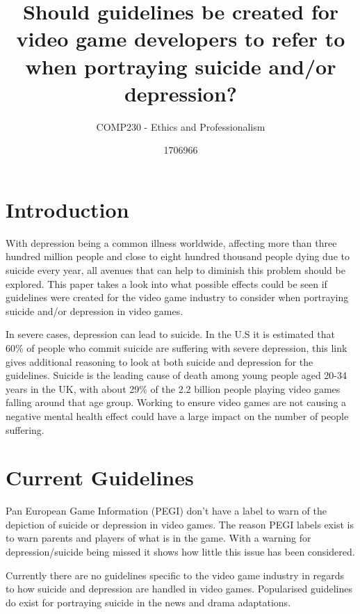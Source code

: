 \documentclass{scrartcl}
\title{Should guidelines be created for video game developers to
	refer to when portraying suicide and/or depression?}
\subtitle{COMP230 - Ethics and Professionalism}
\author{1706966}
\begin{document}
	
	\maketitle
	
	
	\abstract{}
	
	\section{Introduction}
		With depression being a common illness worldwide, affecting more than three hundred million people and close to eight hundred thousand people dying due to suicide every year\cite{DepressionStats}, all avenues that can help to diminish this problem should be explored. This paper takes a look into what possible effects could be seen if guidelines were created for the video game industry to consider when portraying suicide and/or depression in video games.
		
		In severe cases, depression can lead to suicide. In the U.S it is estimated that 60\% of people who commit suicide are suffering with severe depression\cite{SuicideToDepression}, this link gives additional reasoning to look at both suicide and depression for the guidelines. Suicide is the leading cause of death among young people aged 20-34 years in the UK\cite{youngAge}, with about 29\%\cite{sales2018essential} of the 2.2 billion\cite{globalGame} people playing video games falling around that age group. Working to ensure video games are not causing a negative mental health effect could have a large impact on the number of people suffering.
	
	\section{Current Guidelines}
		Pan European Game Information (PEGI) don't have a label to warn of the depiction of suicide or depression in video games\cite{pegiNoRating}. The reason PEGI labels exist is to warn parents and players of what is in the game. With a warning for depression/suicide being missed it shows how little this issue has been considered.
		
		Currently there are no guidelines specific to the video game industry in regards to how suicide and depression are handled in video games. Popularised guidelines do exist for portraying suicide in the news\cite{world2017preventing}\cite{nepon2009media} and drama adaptations\cite{DramaGuidelines}.
		
\end{document}
